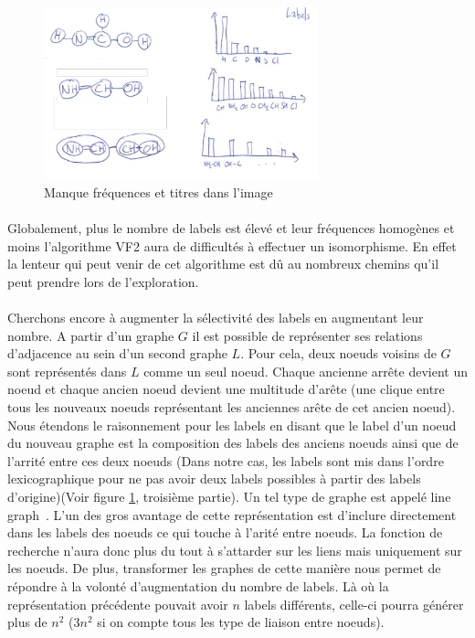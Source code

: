 \documentclass[12pt,french,twoside]{report}
\begin{document}
\begin{figure}
  \includegraphics[width=300px]{Figures/s2m/representations/all_tmp.pdf}
  \caption{\label{representations}Manque fréquences et titres dans l'image}
\end{figure}

\paragraph{}Globalement, plus le nombre de labels est élevé et leur fréquences homogènes et moins l'algorithme VF2 aura de
difficultés à effectuer un isomorphisme. En effet la lenteur qui peut venir de cet algorithme est dû au nombreux chemins qu'il
peut prendre lors de l'exploration.

\paragraph{}Cherchons encore à augmenter la sélectivité des labels en augmentant leur nombre. A partir d'un graphe $G$ il est
possible de représenter ses relations d'adjacence au sein d'un second graphe $L$. Pour cela, deux noeuds voisins de $G$ sont
représentés dans $L$ comme un seul noeud. Chaque ancienne arrête devient un noeud et chaque ancien noeud devient une multitude
d'arête (une clique entre tous les nouveaux noeuds représentant les anciennes arête de cet ancien noeud). Nous étendons le 
raisonnement pour les labels en disant que le label d'un noeud du nouveau graphe est la composition des labels des anciens
noeuds ainsi que de l'arrité entre ces deux noeuds (Dans notre cas, les labels sont mis dans l'ordre lexicographique pour ne pas
avoir deux labels possibles à partir des labels d'origine)(Voir figure \ref{representations},
troisième partie). Un tel type de graphe est appelé line graph~\cite{orlin_line-digraphs_1978}. L'un des
gros avantage de cette représentation est d'inclure directement dans les labels des noeuds ce qui touche à l'arité entre noeuds.
La fonction
de recherche n'aura donc plus du tout à s'attarder sur les liens mais uniquement sur les noeuds. De plus, transformer les graphes
de cette manière nous permet de répondre à la volonté d'augmentation du nombre de labels. Là où la représentation précédente
pouvait avoir $n$ labels différents, celle-ci pourra générer plus de $n^2$ ($3n^2$ si on compte tous les type de liaison entre
noeuds).
\end{document}
